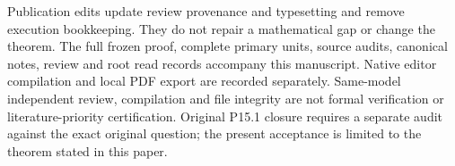 \documentclass[
]{article}
\begin{document}
Publication edits update review provenance and typesetting and remove
execution bookkeeping. They do not repair a mathematical gap or change
the theorem. The full frozen proof, complete primary units, source audits,
canonical notes, review and root read records accompany this manuscript.
Native editor compilation and local PDF export are recorded separately.
Same-model independent review, compilation and file integrity are not
formal verification or literature-priority certification. Original P15.1
closure requires a separate audit against the exact original question;
the present acceptance is limited to the theorem stated in this paper.
\end{document}
